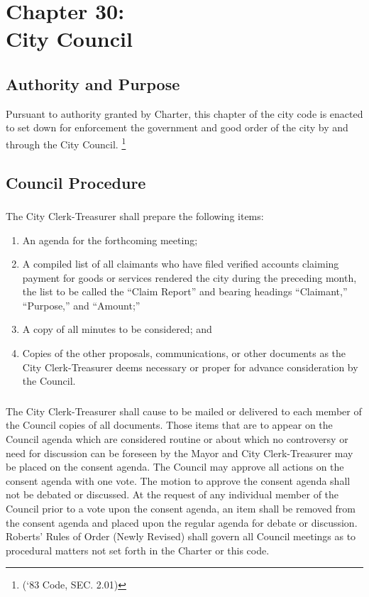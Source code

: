 \chapter*{Chapter 30: \\
	City Council}
    \minitoc
    \pagebreak

\section{Authority and Purpose}
Pursuant to authority granted by Charter, this chapter of the city code is enacted to set down for enforcement the government and good order of the city by and through the City Council.  \footnote{(‘83 Code, SEC. 2.01)}


\section{Council Procedure}
\subsection{}
The City Clerk-Treasurer shall prepare the following items:
\begin{enumerate}
    \item An agenda for the forthcoming meeting;
    \item A compiled list of all claimants who have filed verified accounts claiming payment for goods or services rendered the city during the preceding month, the list to be called the “Claim Report” and bearing headings “Claimant,” “Purpose,” and “Amount;”
    \item A copy of all minutes to be considered; and
    \item Copies of the other proposals, communications, or other documents as the City Clerk-Treasurer deems necessary or proper for advance consideration by the Council.
\end{enumerate}
\subsection{}
The City Clerk-Treasurer shall cause to be mailed or delivered to each member of the Council copies of all documents.  Those items that are to appear on the Council agenda which are considered routine or about which no controversy or need for discussion can be foreseen by the Mayor and City Clerk-Treasurer may be placed on the consent agenda.  The Council may approve all actions on the consent agenda with one vote.  The motion to approve the consent agenda shall not be debated or discussed.  At the request of any individual member of the Council prior to a vote upon the consent agenda, an item shall be removed from the consent agenda and placed upon the regular agenda for debate or discussion.  Roberts’ Rules of Order (Newly Revised) shall govern all Council meetings as to procedural matters not set forth in the Charter or this code.
